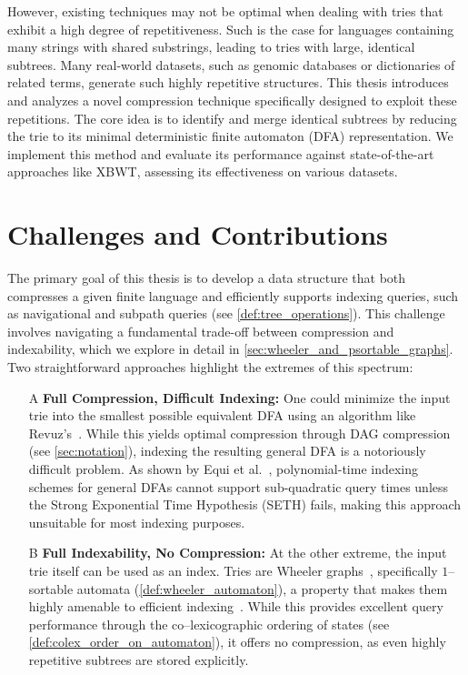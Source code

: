 However, existing techniques may not be optimal when dealing with tries that exhibit a high degree of repetitiveness. Such is the case for languages containing many strings with shared substrings, leading to tries with large, identical subtrees. Many real-world datasets, such as genomic databases or dictionaries of related terms, generate such highly repetitive structures. This thesis introduces and analyzes a novel compression technique specifically designed to exploit these repetitions. The core idea is to identify and merge identical subtrees by reducing the trie to its minimal deterministic finite automaton (DFA) representation. We implement this method and evaluate its performance against state-of-the-art approaches like XBWT, assessing its effectiveness on various datasets.

\section{Challenges and Contributions}
The primary goal of this thesis is to develop a data structure that both compresses a given finite language and efficiently supports indexing queries, such as navigational and subpath queries (see \cref{def:tree_operations}). This challenge involves navigating a fundamental trade-off between compression and indexability, which we explore in detail in \cref{sec:wheeler_and_psortable_graphs}. Two straightforward approaches highlight the extremes of this spectrum:

\begin{enumerate}
    \item[A] \textbf{Full Compression, Difficult Indexing:} One could minimize the input trie into the smallest possible equivalent DFA using an algorithm like Revuz's~\cite{revuz1992minimisation}. While this yields optimal compression through DAG compression (see \cref{sec:notation}), indexing the resulting general DFA is a notoriously difficult problem. As shown by Equi et al.~\cite{equiGraphsCannotBe2023}, polynomial-time indexing schemes for general DFAs cannot support sub-quadratic query times unless the Strong Exponential Time Hypothesis (SETH) fails, making this approach unsuitable for most indexing purposes.
    
    \item[B] \textbf{Full Indexability, No Compression:} At the other extreme, the input trie itself can be used as an index. Tries are Wheeler graphs~\cite{gagie2017wheeler}, specifically $1$--sortable automata (\cref{def:wheeler_automaton}), a property that makes them highly amenable to efficient indexing~\cite{cotumaccio2023co}. While this provides excellent query performance through the co--lexicographic ordering of states (see \cref{def:colex_order_on_automaton}), it offers no compression, as even highly repetitive subtrees are stored explicitly.
\end{enumerate}

